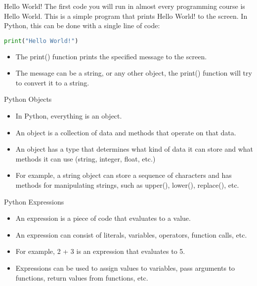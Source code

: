 \documentclass[
    aspectratio=169, 
    usepdftitle=false, 
    xcolor={dvipsnames},
    hyperref={
        colorlinks,
        linkcolor=black,
        urlcolor=blue}
    ]{beamer}
\begin{document}
\begin{frame}[fragile]{Hello World!}
    The first code you will run in almost every programming course is Hello World. This is a simple program that prints Hello World! to the screen. In Python, this can be done with a single line of code:

    \begin{lstlisting}[language=Python]
print("Hello World!")
    \end{lstlisting}

    \begin{itemize}
        \item The print() function prints the specified message to the screen.
        \item The message can be a string, or any other object, the print() function will try to convert it to a string.
    \end{itemize}
\end{frame}

\begin{frame}{Python Objects}
    \begin{itemize}
        \item In Python, everything is an object.
        \item An object is a collection of data and methods that operate on that data.
        \item An object has a type that determines what kind of data it can store and what methods it can use (string, integer, float, etc.)
        \item For example, a string object can store a sequence of characters and has methods for manipulating strings, such as upper(), lower(), replace(), etc.
    \end{itemize}
\end{frame}

\begin{frame}{Python Expressions}
    \begin{itemize}
        \item An expression is a piece of code that evaluates to a value.
        \item An expression can consist of literals, variables, operators, function calls, etc.
        \item For example, 2 + 3 is an expression that evaluates to 5.
        \item Expressions can be used to assign values to variables, pass arguments to functions, return values from functions, etc.
    \end{itemize}
\end{frame}
\end{document}
